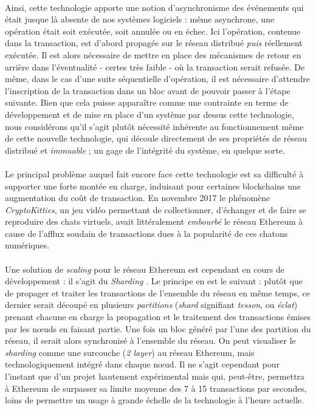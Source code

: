 \paragraph{} Ainsi, cette technologie apporte une notion d'asynchronisme des événements qui était jusque là absente de nos
systèmes logiciels : même asynchrone, une opération était soit exécutée, soit annulée ou en échec. Ici l'opération, contenue 
dans la transaction, est d'abord propagée sur le réseau distribué \emph{puis} réellement exécutée. Il est alors nécessaire 
de mettre en place des mécanismes de retour en arrière dans l'éventualité - certes très faible - où la transaction serait refusée.
De même, dans le cas d'une suite séquentielle d'opération, il est nécessaire d'attendre l'inscription de la transaction dans 
un bloc avant de pouvoir passer à l'étape suivante. Bien que cela puisse apparaître comme une contrainte en terme de développement
et de mise en place d'un système par dessus cette technologie, nous considérons qu'il s'agit plutôt nécessité inhérente au 
fonctionnement même de cette nouvelle technologie, qui découle directement de ses propriétés de réseau distribué et \emph{immuable} ;
un gage de l'intégrité du système, en quelque sorte.

\paragraph{} Le principal problème auquel fait encore face cette technologie est sa difficulté à supporter une forte montée 
en charge, induisant pour certaines blockchains une augmentation du coût de transaction. En novembre 2017 le phénomène
\emph{CryptoKitties}, un jeu vidéo permettant de collectionner, d'échanger et de faire se reproduire des chats virtuels,
avait littéralement \emph{embourbé} le réseau Ethereum à cause de l'afflux soudain de transactions dues à la popularité
de ces chatons numériques.


\paragraph{} Une solution de \emph{scaling} pour le réseau Ethereum est cependant en cours de développement : il s'agit du 
\emph{Sharding} \cite{Blockchain0}. Le principe en est le suivant : plutôt que de propager et traiter les transactions de
l'ensemble du réseau en même temps, ce dernier serait découpé en plusieurs \emph{partitions} (\emph{shard} signifiant 
\emph{tesson}, ou \emph{éclat}) prenant chacune en charge la propagation et le traitement des transactions émises par les
n\oe{}uds en faisant partie. Une fois un bloc généré par l'une des partition du réseau, il serait alors synchronisé à l'ensemble
du réseau. On peut visualiser le \emph{sharding} comme une surcouche (\emph{2 layer}) au réseau Ethereum, mais technologiquement
intégré dans chaque n\oe{}ud. Il ne s'agit cependant pour l'instant que d'un projet hautement expérimental mais qui, peut-être, 
permettra à Ethereum de surpasser sa limite moyenne des 7 à 15 transactions par secondes, loins de permettre un usage à grande
échelle de la technologie à l'heure actuelle.

